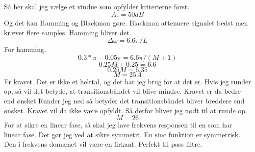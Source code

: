 \begin{Opgaver}
\begin{kapitel}
\begin{Opgave}[Opgave 10.10]
\begin{UnderOpgave}
                Så her skal jeg vælge et vindue som opfylder kriterierne først. 
                \[A_s = 50dB\]
                Og det kan Hamming og Blackman gøre. 
                Blackman attenuere signalet bedst men kræver flere samples.
                Hamming bliver det. 
                \[\Delta \omega = 6.6\pi / L \] 
                For hamming. 
                \[0.3 * \pi - 0.05 \pi = 6.6 \pi / (M + 1)\]
                \[0.25M + 0.25 = 6.6\]
                \[0.25M = 6.35 \]
                \[M = 25.4\]
                Er kravet. Det er ikke et helttal, og det har jeg brug for at det er. 
                Hvis jeg runder op, så vil det betyde, at transitionsbåndet vil blive mindre. Kravet er da bedre end ønsket
                Runder jeg ned så betyder det transitionsbåndet bliver breddere end ønsket.   Kravet vil da ikke være opfyldt.
                Så derfor bliver jeg nødt til at runde op. 
                \[M = 26\]
                For at sikre en linear fase, så skal jeg lave frekvens responsen til en som har linear fase.
                Det gør jeg ved at sikre symmetri. 
                En sinc funktion er symmetrisk. Den i frekvens domænet vil være en firkant. Perfekt til pass filtre.  
                








\end{UnderOpgave}
\end{Opgave}
\end{kapitel}
\end{Opgaver}
